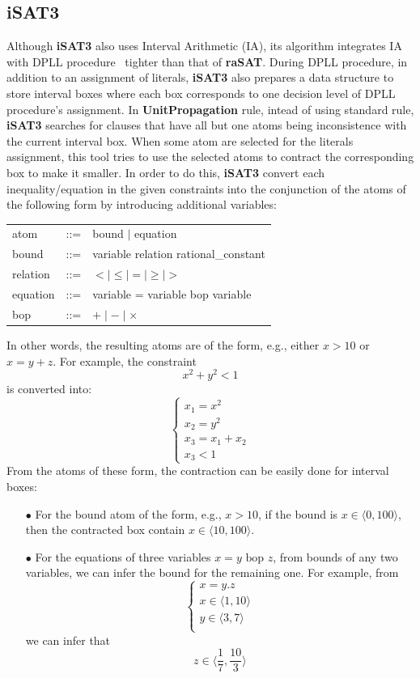 \documentclass[runningheads,a4paper,oribibl]{llncs}
\begin{document}
\subsection*{iSAT3}
Although \textbf{iSAT3} also uses Interval Arithmetic (IA), its algorithm integrates IA with DPLL procedure~\cite{dpll} tighter than that of \textbf{raSAT}. During DPLL procedure, in addition to an assignment of literals, \textbf{iSAT3} also prepares a data structure to store interval boxes where each box corresponds to one decision level of DPLL procedure's assignment. In \textbf{UnitPropagation} rule, intead of using standard rule, \textbf{iSAT3} searches for clauses that have all but one atoms being inconsistence with the current interval box. When some atom are selected for the literals assignment, this tool tries to use the selected atoms to contract the corresponding box to make it smaller. In order to do this, \textbf{iSAT3} convert each inequality/equation in the given constraints into the conjunction of the atoms of the following form by introducing additional variables:
\begin{center}
\begin{tabular}{l c l}
atom &::=& bound $\mid$ equation \\
bound &::=& variable relation rational\_constant \\
relation &::=& $< \mid \le \mid = \mid \ge \mid >$ \\
equation &::=& variable = variable bop variable \\
bop &::=& $+ \mid - \mid \times$
\end{tabular}
\end{center}
In other words, the resulting atoms are of the form, e.g., either $x > 10$ or $x = y + z$. For example, the constraint \[x^2 + y^2 < 1\]
is converted into:
\[\left\{ 
  \begin{array}{l}
    x_1 = x^2\\
    x_2 = y^2\\
    x_3 = x_1 + x_2\\
    x_3 < 1
   \end{array}
    \right.\]
From the atoms of these form, the contraction can be easily done for interval boxes:
\begin{itemize}
\item[$\bullet$] For the bound atom of the form, e.g., $x > 10$, if the bound is $x \in \langle 0, 100 \rangle$, then the contracted box contain $x \in \langle 10, 100 \rangle$.
\item[$\bullet$] For the equations of three variables $x = y \text{ bop } z$, from bounds of any two variables, we can infer the bound for the remaining one. For example, from
\[\left\{ 
  \begin{array}{l}
    x = y.z\\
    x \in \langle 1, 10 \rangle \\
    y \in \langle 3, 7 \rangle\\
   \end{array}
    \right.\]
we can infer that \[z \in \langle \frac{1}{7}, \frac{10}{3} \rangle \]
\end{itemize}
\end{document}
